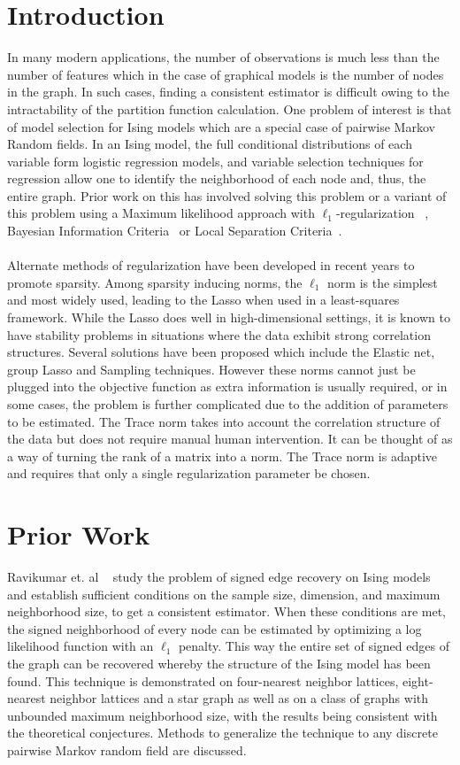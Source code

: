 \documentclass[11pt]{article}
\begin{document}
\section{Introduction}
In many modern applications, the number of observations is much less than the number of features which in the case of graphical models is the number of nodes in the graph. In such cases, finding a consistent estimator is difficult owing to the intractability of the partition function calculation. One problem of interest is that of model selection for Ising models which are a special case of pairwise Markov Random fields. In an Ising model, the full conditional distributions of each variable form logistic regression models, and variable selection techniques for regression allow one to identify the neighborhood of each node and, thus, the entire graph. Prior work on this has involved solving this problem or a variant of this problem using a Maximum likelihood approach with $\ell_1$-regularization ~\cite{ravikumar2010high}, Bayesian Information Criteria~\cite{barber2015high} or Local Separation Criteria~\cite{anandkumar2012high}. \\ \\
Alternate methods of regularization have been developed in recent years to promote sparsity. Among sparsity inducing norms, the $\ell_1$ norm is the simplest and most widely used, leading to the Lasso when used in a least-squares framework. While the Lasso does well in high-dimensional settings, it is known to have stability problems in situations where the data exhibit strong correlation structures. Several solutions have been proposed which include the Elastic net, group Lasso and Sampling techniques. However these norms cannot just be plugged into the objective function as extra information is usually required, or in some cases, the problem is further complicated due to the addition of parameters to be estimated. The Trace norm takes into account the correlation structure of the data but does not require manual human intervention. It can be thought of as a way of turning the rank of a matrix into a norm. The Trace norm is adaptive and requires that only a single regularization parameter be chosen. 	

\section{Prior Work}
Ravikumar et. al ~\cite{ravikumar2010high} study the problem of signed edge recovery on Ising models and establish sufficient conditions on the sample size, dimension, and maximum neighborhood size, to get a consistent estimator. When these conditions are met, the signed neighborhood of every node can be estimated by optimizing a log likelihood function with an $\ell_1$ penalty. This way the entire set of signed edges of the graph can be recovered whereby the structure of the Ising model has been found. This technique is demonstrated on four-nearest neighbor lattices, eight-nearest neighbor lattices and a star graph as well as on a class of graphs with unbounded maximum neighborhood size, with the results being consistent with the theoretical conjectures. Methods to generalize the technique to any discrete pairwise Markov random field are discussed.
 
\end{document}
